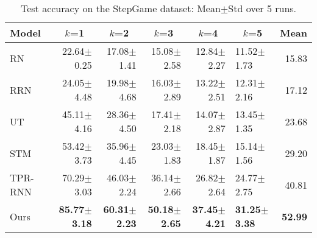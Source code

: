 \documentclass[letterpaper]{article} \usepackage{aaai22}  \usepackage{times}  \usepackage{helvet}  \usepackage{courier}  \usepackage[hyphens]{url}  \usepackage{graphicx} \urlstyle{rm} \def\UrlFont{\rm}  \usepackage{natbib}  \usepackage{caption} \DeclareCaptionStyle{ruled}{labelfont=normalfont,labelsep=colon,strut=off} \frenchspacing  \setlength{\pdfpagewidth}{8.5in}  \setlength{\pdfpageheight}{11in}  \usepackage{algorithm}
\begin{document}
\begin{table*}[!th]
\small
\centering
\begin{adjustbox}{max width=0.92\textwidth}
\begin{tabular}{l|rrrrl|r}
\hline
\hline
Model & \multicolumn{1}{c}{$k$=1} & \multicolumn{1}{c}{$k$=2} & \multicolumn{1}{c}{$k$=3} & \multicolumn{1}{c}{$k$=4} & \multicolumn{1}{c|}{$k$=5} & Mean \\ \hline
RN~\cite{santoro2017simple}          & 22.64$\pm$0.25 & 17.08$\pm$1.41 & 15.08$\pm$2.58 & 12.84$\pm$2.27 & 11.52$\pm$1.73 & 15.83 \\
RRN~\cite{palm2018recurrent}         & 24.05$\pm$4.48 & 19.98$\pm$4.68 & 16.03$\pm$2.89 & 13.22$\pm$2.51 & 12.31$\pm$2.16 & 17.12 \\
UT~\cite{dehghani2018universal}      & 45.11$\pm$4.16 & 28.36$\pm$4.50 & 17.41$\pm$2.18 & 14.07$\pm$2.87 & 13.45$\pm$1.35 & 23.68 \\
STM~\cite{le2020self}                & 53.42$\pm$3.73 & 35.96$\pm$4.45 & 23.03$\pm$1.83 & 18.45$\pm$1.87 & 15.14$\pm$1.56 & 29.20 \\
TPR-RNN~\cite{schlag2018learning}    & 70.29$\pm$3.03 & 46.03$\pm$2.24 & 36.14$\pm$2.66 & 26.82$\pm$2.64 & 24.77$\pm$2.75 & 40.81 \\ \hline
Ours                         & \textbf{85.77$\pm$3.18}  & \textbf{60.31$\pm$2.23} & \textbf{50.18$\pm$2.65} & \textbf{37.45$\pm$4.21} & \textbf{31.25$\pm$3.38} & \textbf{52.99} \\ \hline
\hline
\end{tabular}
\end{adjustbox}
\caption{Test accuracy on the StepGame dataset: Mean$\pm$Std over 5 runs.}
\label{tbls:step_game_hard}
\vspace{0.5em}
\end{table*}
\end{document}
